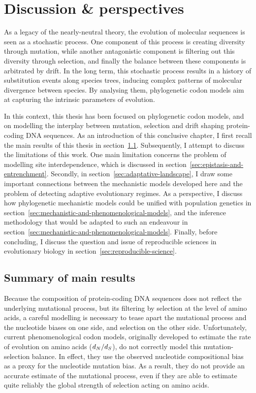 \chapter{Discussion \& perspectives}
\label{ch:discussion-perspectives}
{\hypersetup{linkcolor=GREYDARK}\minitoc}

As a legacy of the nearly-neutral theory, the evolution of molecular sequences is seen as a stochastic process.
One component of this process is creating diversity through mutation, while another antagonistic component is filtering out this diversity through selection, and finally the balance between these components is arbitrated by drift.
In the long term, this stochastic process results in a history of substitution events along species trees, inducing complex patterns of molecular divergence between species.
By analysing them, phylogenetic codon models aim at capturing the intrinsic parameters of evolution.

In this context, this thesis has been focused on phylogenetic codon models, and on modelling the interplay between mutation, selection and drift shaping protein-coding DNA sequences.
As an introduction of this conclusive chapter, I first recall the main results of this thesis in section~\ref{sec:summary-of-main-results}.
Subsequently, I attempt to discuss the limitations of this work.
One main limitation concerns the problem of modelling site interdependence, which is discussed in section~\ref{sec:epistasis-and-entrenchment}.
Secondly, in section~\ref{sec:adaptative-landscape}, I draw some important connections between the mechanistic models developed here and the problem of detecting adaptive evolutionary regimes.
As a perspective, I discuss how phylogenetic mechanistic models could be unified with population genetics in section~\ref{sec:mechanistic-and-phenomenological-models}, and the inference methodology that would be adapted to such an endeavour in section~\ref{sec:mechanistic-and-phenomenological-models}.
Finally, before concluding, I discuss the question and issue of reproducible sciences in evolutionary biology in section~\ref{sec:reproducible-science}.


\section{Summary of main results}
\label{sec:summary-of-main-results}

Because the composition of protein-coding DNA sequences does not reflect the underlying mutational process, but its filtering by selection at the level of amino acids, a careful modelling is necessary to tease apart the mutational process and the nucleotide biases on one side, and selection on the other side.
Unfortunately, current phenomenological codon models, originally developed to estimate the rate of evolution on amino acids ($d_N / d_S$), do not correctly model this mutation-selection balance.
In effect, they use the observed nucleotide compositional bias as a proxy for the nucleotide mutation bias.
As a result, they do not provide an accurate estimate of the mutational process, even if they are able to estimate quite reliably the global strength of selection acting on amino acids.

